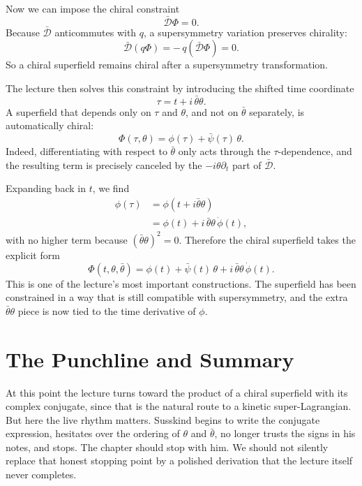Now we can impose the chiral constraint
\begin{equation}
\bar{\mathcal D}\Phi = 0.
\end{equation}
Because \(\bar{\mathcal D}\) anticommutes with \(q\), a supersymmetry variation preserves chirality:
\begin{equation}
\bar{\mathcal D}(q\Phi) = -\,q(\bar{\mathcal D}\Phi)=0.
\end{equation}
So a chiral superfield remains chiral after a supersymmetry transformation.

The lecture then solves this constraint by introducing the shifted time coordinate
\begin{equation}
\tau = t + i\,\bar\theta\theta.
\end{equation}
A superfield that depends only on \(\tau\) and \(\theta\), and not on \(\bar\theta\) separately, is automatically chiral:
\begin{equation}
\Phi(\tau,\theta)=\phi(\tau)+\bar\psi(\tau)\,\theta.
\end{equation}
Indeed, differentiating with respect to \(\bar\theta\) only acts through the \(\tau\)-dependence, and the resulting term is precisely canceled by the \(-i\theta\partial_t\) part of \(\bar{\mathcal D}\).

Expanding back in \(t\), we find
\begin{align}
\phi(\tau)
&=
\phi\!\left(t+i\bar\theta\theta\right) \\
&=
\phi(t) + i\,\bar\theta\theta\,\dot\phi(t),
\end{align}
with no higher term because \((\bar\theta\theta)^2=0\). Therefore the chiral superfield takes the explicit form
\begin{equation}
\Phi(t,\theta,\bar\theta)
=
\phi(t)+\bar\psi(t)\,\theta+i\,\bar\theta\theta\,\dot\phi(t).
\end{equation}
This is one of the lecture's most important constructions. The superfield has been constrained in a way that is still compatible with supersymmetry, and the extra \(\bar\theta\theta\) piece is now tied to the time derivative of \(\phi\).

\section{The Punchline and Summary}

At this point the lecture turns toward the product of a chiral superfield with its complex conjugate, since that is the natural route to a kinetic super-Lagrangian. But here the live rhythm matters. Susskind begins to write the conjugate expression, hesitates over the ordering of \(\theta\) and \(\bar\theta\), no longer trusts the signs in his notes, and stops. The chapter should stop with him. We should not silently replace that honest stopping point by a polished derivation that the lecture itself never completes.

